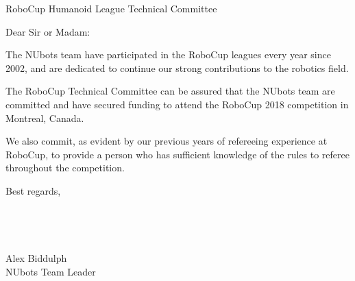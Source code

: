 \documentclass{letter}
\begin{document}
\begin{letter}{RoboCup Humanoid League Technical Committee}
\opening{Dear Sir or Madam:}
The NUbots team have participated in the RoboCup leagues every year since 2002, and are dedicated to continue our strong contributions to the robotics field.

The RoboCup Technical Committee can be assured that the NUbots team are committed and have secured funding to attend the RoboCup 2018 competition in Montreal, Canada.

We also commit, as evident by our previous years of refereeing experience at RoboCup, to provide a person who has sufficient knowledge of the rules to referee throughout the competition.

Best regards, \\ \\ \\ \\ \\  Alex Biddulph \\ NUbots Team Leader

\end{letter}
\end{document}
